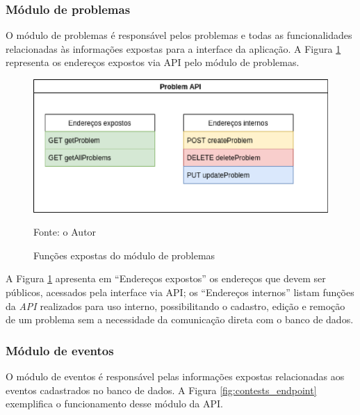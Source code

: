 \subsubsection{Módulo de problemas}
\label{subsubsec:moduloDeProblemas}

O módulo de problemas é responsável pelos problemas e todas as funcionalidades relacionadas às informações expostas para a interface da aplicação. A Figura \ref{fig:problems_endpoints} representa os endereços expostos via API pelo módulo de problemas.

\begin{figure}
    \centering
    \caption{Funções expostas do módulo de problemas}
    \includegraphics[keepaspectratio=true,scale=0.5]{figuras/problems_endpoins.eps}
    \label{fig:problems_endpoints}
    
    \medskip
    Fonte: o Autor
    \medskip
\end{figure}

A Figura \ref{fig:problems_endpoints} apresenta em ``Endereços expostos'' os endereços que devem ser públicos, acessados pela interface via API; os ``Endereços internos'' listam funções da \textit{API} realizados para uso interno, possibilitando o cadastro, edição e remoção de um problema sem a necessidade da comunicação direta com o banco de dados.

\subsubsection{Módulo de eventos}
\label{subsec:moduloDeEventos}

O módulo de eventos é responsável pelas informações expostas relacionadas aos eventos cadastrados no banco de dados. A Figura \ref{fig:contests_endpoint} exemplifica o funcionamento desse módulo da API.


